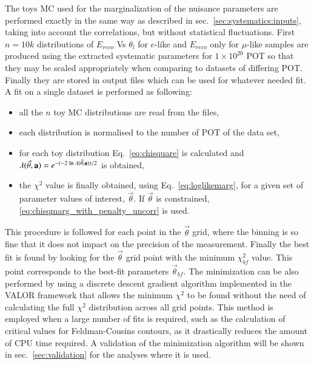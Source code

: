 The toys MC used for the marginalization of the nuisance parameters are performed exactly in the same way as 
described in 
sec.~\ref{sec:systematics:inputs}, taking into account the correlations, but without statistical fluctuations.
First $n = 10k$ distributions of $E_{reco}$ Vs $\theta_l$ for $e$-like and $E_{reco}$ only for $\mu$-like samples
are produced using the extracted systematic parameters
for $1 \times 10^{20}$ POT so that they may be scaled appropriately when comparing to datasets of differing POT.
Finally they are stored in output files which can be used for whatever needed fit.
A fit on a single dataset is performed as following:
\begin{itemize}
\item all the $n$ toy MC distributions are read from the files,
\item each distribution is normalised to the number of POT of the data set,
\item for each toy distribution Eq.~\ref{eq:chisquare} is calculated and $\lambda(\vec{\theta},{\bf a}) = e^{- (-2 \; \textrm{ln} \; \lambda (\vec{\theta},{\bf a})) / 2}$ is obtained,
\item the $\chi^2$ value is finally obtained, using Eq.~\ref{eq:loglikemarg}, for a given set of parameter values of interest, $\vec{\theta}$.
	If $\vec{\theta}$ is constrained, \cref{eq:chisqmarg_with_penalty_uncorr} is used.
\end{itemize}

This procedure is followed for each point in the $\vec{\theta}$ grid, where the binning 
is so fine that it does not impact on the precision of the measurement.
Finally the best fit is found by looking for the $\vec{\theta}$ grid point 
with the minimum $\chi^2_{bf}$ value.
This point corresponds to the best-fit parameters $\vec{\theta}_{bf}$. 
The minimization can be also performed by using a discrete descent gradient algorithm
implemented in the VALOR framework that allows the minimum $\chi^2$ 
to be found without the need of calculating the full $\chi^2$ distribution across all grid points.
This method is employed when a large number of fits is required, such as the calculation of critical values
for Feldman-Cousins contours, as it drastically reduces the amount of CPU time required.
A validation of the minimization algorithm will be shown in sec.~\ref{sec:validation} %
for the analyses where it is used.


